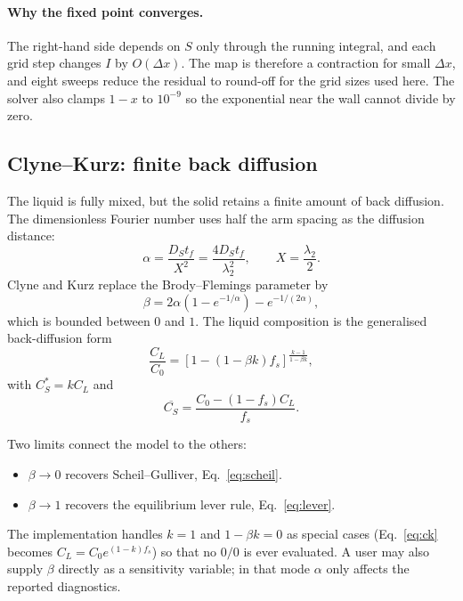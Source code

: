 \documentclass[11pt,a4paper]{article}
\begin{document}
\paragraph{Why the fixed point converges.} The right-hand side depends on $S$
only through the running integral, and each grid step changes $I$ by
$O(\Delta x)$. The map is therefore a contraction for small $\Delta x$, and
eight sweeps reduce the residual to round-off for the grid sizes used here.
The solver also clamps $1-x$ to $10^{-9}$ so the exponential near the wall
cannot divide by zero.

\subsection{Clyne--Kurz: finite back diffusion}

The liquid is fully mixed, but the solid retains a finite amount of back
diffusion. The dimensionless Fourier number uses half the arm spacing as the
diffusion distance:
\begin{equation}
  \alpha=\frac{D_S t_f}{X^2}=\frac{4D_S t_f}{\lambda_2^2},
  \qquad X=\frac{\lambda_2}{2}.
\end{equation}
Clyne and Kurz replace the Brody--Flemings parameter by
\begin{equation}
  \boxed{\beta = 2\alpha\left(1-e^{-1/\alpha}\right)-e^{-1/(2\alpha)}},
  \label{eq:beta}
\end{equation}
which is bounded between $0$ and $1$. The liquid composition is the
generalised back-diffusion form
\begin{equation}
  \boxed{\frac{C_L}{C_0}=\left[1-(1-\beta k)f_s\right]^{\frac{k-1}{1-\beta k}}},
  \label{eq:ck}
\end{equation}
with $C_S^*=kC_L$ and
\begin{equation}
  \overline{C_S}=\frac{C_0-(1-f_s)C_L}{f_s}.
\end{equation}

Two limits connect the model to the others:
\begin{itemize}[leftmargin=1.4em,itemsep=0.1em]
  \item $\beta\to0$ recovers Scheil--Gulliver, Eq.~\eqref{eq:scheil}.
  \item $\beta\to1$ recovers the equilibrium lever rule, Eq.~\eqref{eq:lever}.
\end{itemize}
The implementation handles $k=1$ and $1-\beta k=0$ as special cases
(Eq.~\eqref{eq:ck} becomes $C_L=C_0e^{(1-k)f_s}$) so that no $0/0$ is ever
evaluated. A user may also supply $\beta$ directly as a sensitivity variable;
in that mode $\alpha$ only affects the reported diagnostics.
\end{document}
